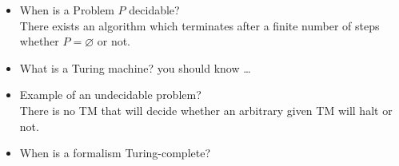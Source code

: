 \documentclass[a4paper, 10pt]{article}
\begin{document}
\begin{itemize}
\begin{itemize}
\[        \right)
        \] so that for all $i,j:c_{ij}\in A_{ij}^*$
        \item we call $(S,C)$ a \emph{global system state}
        \item \textbf{State Transition Relation} let $P$ a protocol and $G=\{(S,C) | (S,C) \textrm{ is a global system state}\}$
    \\
    $\vdash: \; G \to G$ is defined as follows \\
    $(S,C) \vdash (S',C') \; iff \; \exists\; i,k,x_{ik}$ such that either
    \begin{enumerate}
        \item $(S,C)$ and $(S',C')$ are identical except for the following exceptions
        \[ s_i'=\delta(s_i.!x_{ik}) \textrm{ (\blue{sending by i})} \]
        \[ \blue{c'_{ik} =c_{ik}x_{ik} } \]
        \item $(S,C)$ and $(S',C')$ are identical except for the following exceptions
        \[ s'_k = \delta(s_k,?x_{ik}) \textrm{ (\dGreen{receiving by k}) } \]
        \[\dGreen{c_{ik} = x_{ik}c'_{ik}} \]
    \end{enumerate}
    \item Reachable Global System State, Paths and Acceptance
    \begin{itemize}
        \item $G^0$ the initial global system state of a protocol
        \item $G$ a global system state of the same protocol
        \item $\vdash$ the state transition relation of this same protocol
        \item $\vdash^*$ denotes the transitive closure of $\vdash$
    \end{itemize}
    \item we say that $G$ is rechable if \[ G^0 \vdash^* G \]
    \end{itemize}
    \item When is a Problem $P$ decidable? \\
    There exists an algorithm which terminates after a finite number of steps whether $P=\varnothing$ or not.
    \item What is a Turing machine? {\tiny you should know \dots}
    \item Example of an undecidable problem?
    \\ There is no TM that will decide whether an arbitrary given TM will halt or not.
    \item When is a formalism Turing-complete?

\end{itemize}
\end{document}
